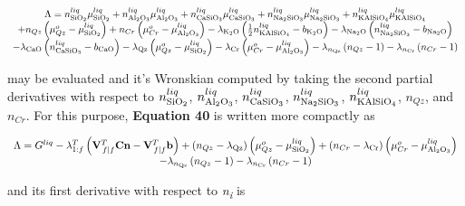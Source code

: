 \documentclass[11pt, titlepage, twoside]{article}
\begin{document}
\begin{MPEquation}[!ht]
\begin{equation}
\begin{array}{c}
\Lambda  = n_{{\rm{Si}}{{\rm{O}}_2}}^{liq}\mu _{{\rm{Si}}{{\rm{O}}_2}}^{liq} + n_{{\rm{A}}{{\rm{l}}_2}{{\rm{O}}_3}}^{liq}\mu _{{\rm{A}}{{\rm{l}}_2}{{\rm{O}}_3}}^{liq} + n_{{\rm{CaSi}}{{\rm{O}}_3}}^{liq}\mu _{{\rm{CaSi}}{{\rm{O}}_3}}^{liq} + n_{{\rm{N}}{{\rm{a}}_{\rm{2}}}{\rm{Si}}{{\rm{O}}_3}}^{liq}\mu _{{\rm{N}}{{\rm{a}}_{\rm{2}}}{\rm{Si}}{{\rm{O}}_3}}^{liq} + n_{{\rm{KAlSi}}{{\rm{O}}_4}}^{liq}\mu _{{\rm{KAlSi}}{{\rm{O}}_4}}^{liq}\\
 + {n_{Qz}}\left( {\mu _{Qz}^o - \mu _{{\rm{Si}}{{\rm{O}}_2}}^{liq}} \right) + {n_{Cr}}\left( {\mu _{Cr}^o - \mu _{{\rm{A}}{{\rm{l}}_2}{{\rm{O}}_3}}^{liq}} \right) - {\lambda _{{{\rm{K}}_2}{\rm{O}}}}\left( {\frac{1}{2}n_{{\rm{KAlSi}}{{\rm{O}}_4}}^{liq} - {b_{{{\rm{K}}_2}{\rm{O}}}}} \right) - {\lambda _{{\rm{N}}{{\rm{a}}_2}{\rm{O}}}}\left( {n_{{\rm{N}}{{\rm{a}}_2}{\rm{Si}}{{\rm{O}}_3}}^{liq} - {b_{{\rm{N}}{{\rm{a}}_2}{\rm{O}}}}} \right)\\
 { - {\lambda _{{\rm{CaO}}}}\left( {n_{{\rm{CaSi}}{{\rm{O}}_3}}^{liq} - {b_{{\rm{CaO}}}}} \right) - {\lambda _{{\rm{Qz}}}}\left( {\mu _{Qz}^o - \mu _{{\rm{Si}}{{\rm{O}}_2}}^{liq}} \right) - {\lambda _{{\rm{Cr}}}}\left( {\mu _{Cr}^o - \mu _{{\rm{A}}{{\rm{l}}_2}{{\rm{O}}_3}}^{liq}} \right) - {\lambda _{{n_{{\rm{Qz}}}}}}\left( {{n_{Qz}} - 1} \right) - {\lambda _{{n_{{\rm{Cr}}}}}}\left( {{n_{Cr}} - 1} \right)}
\end{array}
\end{equation}
\label{MPEquationElement:4E2B7ECA-2540-4E21-EACA-BCC921E50288}
\end{MPEquation}
may be evaluated and it's Wronskian computed by taking the second partial derivatives with respect to $n_{{\rm{Si}}{{\rm{O}}_2}}^{liq}$, $n_{{\rm{A}}{{\rm{l}}_2}{{\rm{O}}_3}}^{liq}$, $n_{{\rm{CaSi}}{{\rm{O}}_3}}^{liq}$, $n_{{\rm{N}}{{\rm{a}}_2}{\rm{Si}}{{\rm{O}}_3}}^{liq}$, $n_{{\rm{KAlSi}}{{\rm{O}}_4}}^{liq}$, ${n_{Qz}}$, and ${n_{Cr}}$. For this purpose, \textbf{Equation 40} is written more compactly as


\begin{MPEquation}[!ht]
\begin{equation}
\begin{array}{c}
\Lambda  = {G^{liq}} - \lambda _{1:f}^T\left( {{\bf{V}}_{\left. f \right|f}^T{\bf{Cn}} - {\bf{V}}_{\left. f \right|f}^T{\bf{b}}} \right) + \left( {{n_{Qz}} - {\lambda _{{\rm{Qz}}}}} \right)\left( {\mu _{Qz}^o - \mu _{{\rm{Si}}{{\rm{O}}_2}}^{liq}} \right) + \left( {{n_{Cr}} - {\lambda _{{\rm{Cr}}}}} \right)\left( {\mu _{Cr}^o - \mu _{{\rm{A}}{{\rm{l}}_2}{{\rm{O}}_3}}^{liq}} \right)\\
 - {\lambda _{{n_{{\rm{Qz}}}}}}\left( {{n_{Qz}} - 1} \right) - {\lambda _{{n_{{\rm{Cr}}}}}}\left( {{n_{Cr}} - 1} \right)
\end{array}
\end{equation}
\label{MPEquationElement:33EFC217-8764-4FD0-F47D-5874D3561334}
\end{MPEquation}
and its first derivative with respect to \emph{n\textsubscript{i}} is
\end{document}
